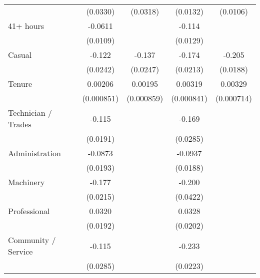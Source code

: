 {\begin{tabular}{l*{4}{c}}
                    &    (0.0330)         &    (0.0318)         &    (0.0132)         &    (0.0106)         \\
[1em]
41+ hours           &     -0.0611\sym{***}&                     &      -0.114\sym{***}&                     \\
                    &    (0.0109)         &                     &    (0.0129)         &                     \\
[1em]
Casual              &      -0.122\sym{***}&      -0.137\sym{***}&      -0.174\sym{***}&      -0.205\sym{***}\\
                    &    (0.0242)         &    (0.0247)         &    (0.0213)         &    (0.0188)         \\
[1em]
Tenure              &     0.00206\sym{*}  &     0.00195\sym{*}  &     0.00319\sym{***}&     0.00329\sym{***}\\
                    &  (0.000851)         &  (0.000859)         &  (0.000841)         &  (0.000714)         \\
[1em]
Technician / Trades &      -0.115\sym{***}&                     &      -0.169\sym{***}&                     \\
                    &    (0.0191)         &                     &    (0.0285)         &                     \\
[1em]
Administration      &     -0.0873\sym{***}&                     &     -0.0937\sym{***}&                     \\
                    &    (0.0193)         &                     &    (0.0188)         &                     \\
[1em]
Machinery           &      -0.177\sym{***}&                     &      -0.200\sym{***}&                     \\
                    &    (0.0215)         &                     &    (0.0422)         &                     \\
[1em]
Professional        &      0.0320         &                     &      0.0328         &                     \\
                    &    (0.0192)         &                     &    (0.0202)         &                     \\
[1em]
Community / Service &      -0.115\sym{***}&                     &      -0.233\sym{***}&                     \\
                    &    (0.0285)         &                     &    (0.0223)         &                     \\

\end{tabular}}

